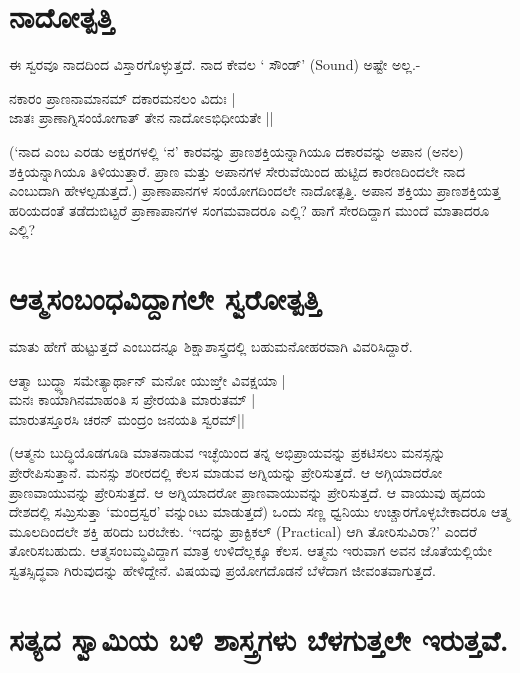 \section*{ನಾದೋತ್ಪತ್ತಿ}

ಈ ಸ್ವರವೂ ನಾದದಿಂದ  ವಿಸ್ತಾರಗೊಳ್ಳುತ್ತದೆ. ನಾದ ಕೇವಲ ` ಸೌಂಡ್' {(\eng Sound)} ಅಷ್ಟೇ ಅಲ್ಲ.-

\begin{shloka}
ನಕಾರಂ ಪ್ರಾಣನಾಮಾನಮ್ ದಕಾರಮನಲಂ ವಿದುಃ |\\
ಜಾತಃ ಪ್ರಾಣಾಗ್ನಿಸಂಯೋಗಾತ್ ತೇನ ನಾದೋಽಭಿಧೀಯತೇ ||
\end{shloka}

(`ನಾದ ಎಂಬ ಎರಡು ಅಕ್ಷರಗಳಲ್ಲಿ  `ನ' ಕಾರವನ್ನು  ಪ್ರಾಣಶಕ್ತಿಯನ್ನಾಗಿಯೂ ದಕಾರವನ್ನು ಅಪಾನ (ಅನಲ) ಶಕ್ತಿಯನ್ನಾಗಿಯೂ ತಿಳಿಯುತ್ತಾರೆ. ಪ್ರಾಣ ಮತ್ತು ಅಪಾನಗಳ ಸೇರುವೆಯಿಂದ ಹುಟ್ಟಿದ ಕಾರಣದಿಂದಲೇ ನಾದ ಎಂಬುದಾಗಿ ಹೇಳಲ್ಪಡುತ್ತದೆ.) ಪ್ರಾಣಾಪಾನಗಳ ಸಂಯೋಗದಿಂದಲೇ ನಾದೋತ್ಪತ್ತಿ. ಅಪಾನ ಶಕ್ತಿಯು ಪ್ರಾಣಶಕ್ತಿಯತ್ತ ಹರಿಯದಂತೆ ತಡೆದುಬಿಟ್ಟರೆ ಪ್ರಾಣಾಪಾನಗಳ ಸಂಗಮವಾದರೂ ಎಲ್ಲಿ? ಹಾಗೆ ಸೇರದಿದ್ದಾಗ ಮುಂದೆ ಮಾತಾದರೂ ಎಲ್ಲಿ?

\section*{ಆತ್ಮಸಂಬಂಧವಿದ್ದಾಗಲೇ ಸ್ವರೋತ್ಪತ್ತಿ}

ಮಾತು ಹೇಗೆ ಹುಟ್ಟುತ್ತದೆ ಎಂಬುದನ್ನೂ  ಶಿಕ್ಷಾಶಾಸ್ತ್ರದಲ್ಲಿ ಬಹುಮನೋಹರವಾಗಿ ವಿವರಿಸಿದ್ದಾರೆ.

\begin{shloka}
ಆತ್ಮಾ ಬುದ್ಧ್ಯಾ ಸಮೇತ್ಯಾರ್ಥಾನ್ ಮನೋ ಯುಙ್ತೇ ವಿವಕ್ಷಯಾ |\\
ಮನಃ ಕಾಯಾಗಿನಮಾಹಂತಿ ಸ ಪ್ರೇರಯತಿ ಮಾರುತಮ್ |\\
ಮಾರುತಸ್ತೂರಸಿ ಚರನ್ ಮಂದ್ರಂ ಜನಯತಿ ಸ್ವರಮ್||
\end{shloka}

(ಆತ್ಮನು ಬುದ್ಧಿಯೊಡಗೂಡಿ ಮಾತನಾಡುವ ಇಚ್ಛೆಯಿಂದ ತನ್ನ ಅಭಿಪ್ರಾಯವನ್ನು ಪ್ರಕಟಿಸಲು ಮನಸ್ಸನ್ನು  ಪ್ರೇರೇಪಿಸುತ್ತಾನೆ. ಮನಸ್ಸು ಶರೀರದಲ್ಲಿ ಕೆಲಸ ಮಾಡುವ ಅಗ್ನಿಯನ್ನು ಪ್ರೇರಿಸುತ್ತದೆ.  ಆ ಅಗ್ಗಿಯಾದರೋ ಪ್ರಾಣವಾಯುವನ್ನು ಪ್ರೇರಿಸುತ್ತದೆ. ಆ ಅಗ್ನಿಯಾದರೋ ಪ್ರಾಣವಾಯುವನ್ನು ಪ್ರೇರಿಸುತ್ತದೆ. ಆ ವಾಯುವು ಹೃದಯ ದೇಶದಲ್ಲಿ ಸಮ್ರಿಸುತ್ತಾ `ಮಂದ್ರಸ್ವರ' ವನ್ನುಂಟು ಮಾಡುತ್ತದೆ) ಒಂದು ಸಣ್ಣ ಧ್ವನಿಯು ಉಚ್ಚಾರಗೊಳ್ಳಬೇಕಾದರೂ ಆತ್ಮ ಮೂಲದಿಂದಲೇ ಶಕ್ತಿ ಹರಿದು ಬರಬೇಕು. `ಇದನ್ನು ಪ್ರಾಕ್ಟಿಕಲ್ {(\eng Practical)} ಆಗಿ ತೋರಿಸುವಿರಾ?' ಎಂದರೆ ತೋರಿಸಬಹುದು. ಆತ್ಮಸಂಬಮ್ಧವಿದ್ದಾಗ ಮಾತ್ರ ಉಳಿದೆಲ್ಲಕ್ಕೂ ಕೆಲಸ. ಆತ್ಮನು ಇರುವಾಗ ಅವನ ಜೊತೆಯಲ್ಲಿಯೇ ಸ್ವತಸ್ಸಿದ್ಧವಾ ಗಿರುವುದನ್ನು  ಹೇಳಿದ್ದೇನೆ. ವಿಷಯವು ಪ್ರಯೋಗದೊಡನೆ ಬೆಳೆದಾಗ ಜೀವಂತವಾಗುತ್ತದೆ.

\section*{ಸತ್ಯದ ಸ್ವಾಮಿಯ ಬಳಿ ಶಾಸ್ತ್ರಗಳು ಬೆಳಗುತ್ತಲೇ ಇರುತ್ತವೆ.}

